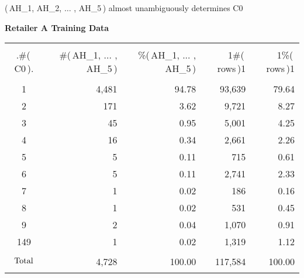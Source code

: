 

\begin{frame}{\small (\,AH\_1, AH\_2, $\ldots$ , AH\_5\,) almost unambiguously determines C0}

{\scriptsize

\begin{center}
\vskip -0.3cm
\textbf{\small Retailer A Training Data}
\vskip 0.05cm
\begin{tabular}{|c|r|r|r|r|}
\hline
&&&&\\
{\color{white}.}\#(\,C0\,){\color{white}.} & \#(\,AH\_1, ... , AH\_5\,) & \%(\,AH\_1, ... , AH\_5\,) & {\color{white}1}\#(\,rows\,){\color{white}1} & {\color{white}1}\%(\,rows\,){\color{white}1} \\
&&&&\\
\hline\hline
1 & 4,481 & 94.78 & 93,639 & 79.64 \\
\hline
2 &   171  &  3.62 &  9,721 &   8.27 \\
\hline
3 &   45  &  0.95 &  5,001 &   4.25 \\
\hline
4 &   16  &  0.34 &  2,661 &   2.26 \\
\hline
5 &   5  &  0.11 &  715 &   0.61 \\
\hline
6 &   5  &  0.11 &  2,741 &   2.33 \\
\hline
7 &   1  &  0.02 &  186 &   0.16 \\
\hline
8 &   1  &  0.02 &  531 &   0.45 \\
\hline
9 &   2  &  0.04 &  1,070 &   0.91 \\
\hline
149 &   1  &  0.02 &  1,319 &   1.12 \\
\hline\hline
$\overset{{\color{white}-}}{\underset{{\color{white}-}}{\textnormal{Total}}}$ &  4,728  & 100.00 &  117,584 & 100.00 \\
\hline
\end{tabular}
\end{center}
}

\end{frame}
\normalsize


